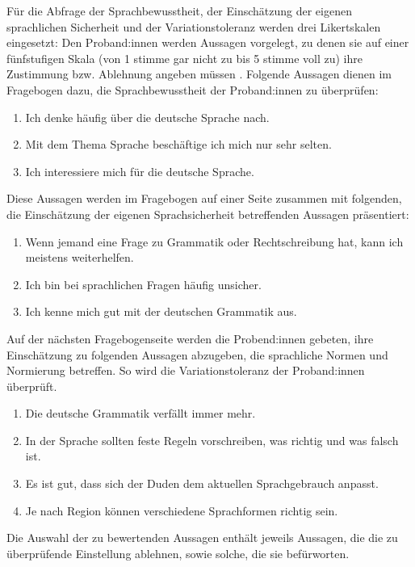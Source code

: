 Für die Abfrage der Sprachbewusstheit, der Einschätzung der eigenen sprachlichen Sicherheit und der Variationstoleranz werden drei Likertskalen eingesetzt: Den Proband:innen werden Aussagen vorgelegt, zu denen sie auf einer fünfstufigen Skala (von 1 \glqq stimme gar nicht zu\grqq{} bis 5 \glqq stimme voll zu\grqq) ihre Zustimmung bzw. Ablehnung angeben müssen \citep[s.][62]{Rasinger2010}. 
Folgende Aussagen dienen im Fragebogen dazu, die Sprachbewusstheit der Proband:innen zu überprüfen: 
\begin{enumerate}
\item Ich denke häufig über die deutsche Sprache nach.
\item Mit dem Thema Sprache beschäftige ich mich nur sehr selten.
\item Ich interessiere mich für die deutsche Sprache. 
\end{enumerate}
Diese Aussagen werden im Fragebogen auf einer Seite zusammen mit folgenden, die Einschätzung der eigenen Sprachsicherheit betreffenden Aussagen präsentiert: 
\largerpage
\begin{enumerate}
\item Wenn jemand eine Frage zu Grammatik oder Rechtschreibung hat, kann ich meistens weiterhelfen.
\item Ich bin bei sprachlichen Fragen häufig unsicher. 
\item Ich kenne mich gut mit der deutschen Grammatik aus.
\end{enumerate}
Auf der nächsten Fragebogenseite werden die Probend:innen gebeten, ihre Einschätzung zu folgenden Aussagen abzugeben, die sprachliche Normen und Normierung betreffen. 
So wird die Variationstoleranz der Proband:innen überprüft. 
\begin{enumerate}
\sloppy
\item Die deutsche Grammatik verfällt immer mehr. 
\item In der Sprache sollten feste Regeln vorschreiben, was richtig und was falsch ist. 
\item Es ist gut, dass sich der Duden dem aktuellen Sprachgebrauch anpasst. 
\item Je nach Region können verschiedene Sprachformen richtig sein. 
\end{enumerate}
Die Auswahl der zu bewertenden Aussagen enthält jeweils Aussagen, die die zu überprüfende Einstellung ablehnen, sowie solche, die sie befürworten. 

